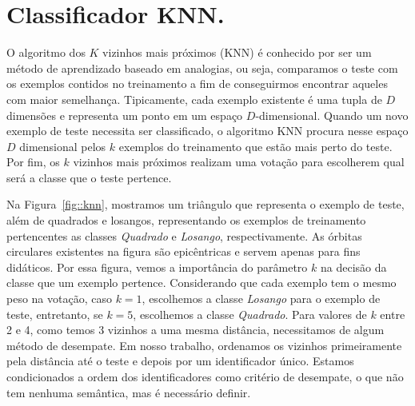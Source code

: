 
\section{Classificador \textsc{KNN}.}
\label{subsec::cred_knn}


O algoritmo dos $K$ vizinhos mais próximos (\textsc{KNN}) é conhecido por ser um método de aprendizado baseado em analogias, ou seja, comparamos o teste com os exemplos contidos no treinamento a fim de conseguirmos encontrar aqueles com maior semelhança. 
Tipicamente, cada exemplo existente é uma tupla de $D$ dimensões e representa um ponto em um espaço $D$-dimensional. 
Quando um novo exemplo de teste necessita ser classificado, o algoritmo \textsc{KNN} procura nesse espaço $D$ dimensional pelos $k$ exemplos do treinamento que estão mais perto do teste. 
Por fim, os $k$ vizinhos mais próximos realizam uma votação para escolherem qual será a classe que o teste pertence.

Na Figura~\ref{fig::knn}, mostramos um triângulo que representa o exemplo de teste, além de quadrados e losangos, representando os exemplos de treinamento pertencentes as classes \textit{Quadrado} e \textit{Losango}, respectivamente. As órbitas circulares existentes na figura são epicêntricas e servem apenas para fins didáticos.
Por essa figura, vemos a importância do parâmetro $k$ na decisão da classe que um exemplo pertence. Considerando que cada exemplo tem o mesmo peso na votação, caso $k=1$, escolhemos a classe \textit{Losango} para o exemplo de teste, entretanto, se $k=5$, escolhemos a classe \textit{Quadrado}. Para valores de $k$ entre 2 e 4, como temos 3 vizinhos a uma mesma distância, necessitamos de algum método de desempate. Em nosso trabalho, ordenamos os vizinhos primeiramente pela distância até o teste e depois por um identificador único. Estamos condicionados a ordem dos identificadores como critério de desempate, o que não tem nenhuma semântica, mas é necessário definir. %

